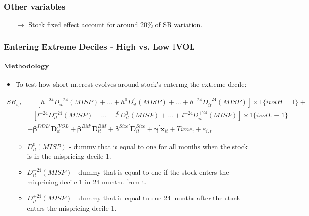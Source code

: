 \documentclass{beamer}
\begin{document}
\begin{frame}
\frametitle{Other variables}

\vspace*{-0.1cm}
\begin{table}[htbp]
  \centering
  \footnotesize
  	  \resizebox{0.4\textwidth}{!}{	 	
	 	
	\label{tab:sr_by_decile_short}%
	}
\end{table}

\begin{itemize}
\item[$\rightarrow$] Stock fixed effect account for around 20\% of SR variation.
\end{itemize}
	\end{frame}

\begin{frame}
		\frametitle{Entering Extreme Deciles - High vs. Low IVOL}
		\framesubtitle{Methodology}	
	\begin{itemize}
		\item To test how short interest evolves around stock’s entering the extreme decile:
	\end{itemize}
{\scriptsize
		\begin{equation}		 \nonumber
		\begin{split}
			SR_{i,t} &= [h^{-24} D^{-24}_{it}(MISP) + \ldots +h^{0} D^0_{it}(MISP) + \ldots + h^{+24} D^{+24}_{it}(MISP)]\times 1\{ ivolH =1 \}+  \\
			& + [l^{-24} D^{-24}_{it}(MISP) + \ldots +l^{0} D^0_{it}(MISP) + \ldots + l^{+24} D^{+24}_{it}(MISP)]\times 1\{ ivolL =1 \}+ \\
			&+\bm{\beta}^{IVOL\prime}  \bm{D}^{IVOL}_{it} + \bm{\beta}^{BM\prime}  \bm{D}^{BM}_{it}+\bm{\beta}^{Size\prime}  \bm{D}^{Size}_{it}  +\bm{\gamma}^\prime \bm{x}_{it} + Time_t +  \varepsilon_{i,t}
		\end{split}
		\end{equation}
}
\begin{itemize}
\item[]
\begin{itemize}
\item $D^0_{it}(MISP)$ - dummy that is equal to one for all months when the stock is in the mispricing decile 1.
\item $D^{-24}_{it}(MISP)$ - dummy that is equal to one if the stock enters the mispricing decile 1 in 24 months from t.
\item $D^{+24}_{it}(MISP)$ - dummy that is equal to one 24 months after the stock enters the mispricing decile 1.

\end{itemize}
\end{itemize}
\end{frame}  
\end{document}
